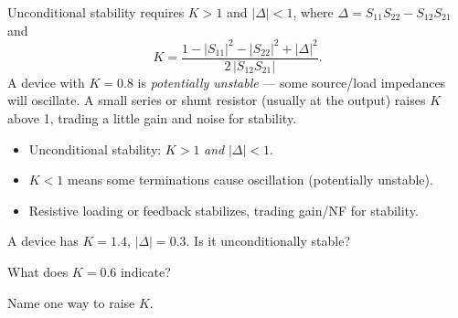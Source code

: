 \begin{workedexample}
Unconditional stability requires $K > 1$ and $|\Delta| < 1$, where
$\Delta = S_{11}S_{22} - S_{12}S_{21}$ and
\[ K = \frac{1 - |S_{11}|^2 - |S_{22}|^2 + |\Delta|^2}{2\,|S_{12}S_{21}|}. \]
A device with $K = 0.8$ is \emph{potentially unstable} --- some source/load
impedances will oscillate. A small series or shunt resistor (usually at the
output) raises $K$ above 1, trading a little gain and noise for stability.
\end{workedexample}

\begin{keytakeaways}
\begin{itemize}[leftmargin=1.4em,itemsep=2pt]
\item Unconditional stability: $K > 1$ \emph{and} $|\Delta| < 1$.
\item $K < 1$ means some terminations cause oscillation (potentially unstable).
\item Resistive loading or feedback stabilizes, trading gain/NF for stability.
\end{itemize}
\end{keytakeaways}

\begin{exercises}
\item A device has $K = 1.4$, $|\Delta| = 0.3$. Is it unconditionally stable?
\item What does $K = 0.6$ indicate?
\item Name one way to raise $K$.
\end{exercises}

